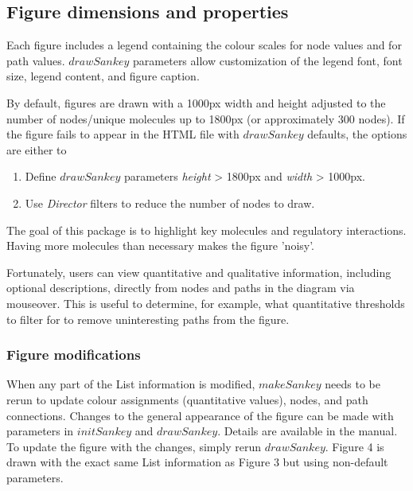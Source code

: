 \documentclass[a4paper]{article}
\begin{document}
    \subsection{Figure dimensions and properties}
Each figure includes a legend containing the colour scales for node values and for path values. $drawSankey$ parameters allow customization of the legend font, font size, legend content, and figure caption.

By default, figures are drawn with a 1000px width and height adjusted to the number of nodes/unique molecules up to 1800px (or approximately 300 nodes). If the figure fails to appear in the HTML file with $drawSankey$ defaults, the options are either to
\begin{enumerate}
    \item Define $drawSankey$ parameters \textit{height} > 1800px and \textit{width} > 1000px.
    \item Use \textit{Director} filters to reduce the number of nodes to draw.
\end{enumerate}

The goal of this package is to highlight key molecules and regulatory interactions. Having more molecules than necessary makes the figure 'noisy'.

Fortunately, users can view quantitative and qualitative information, including optional descriptions, directly from nodes and paths in the diagram via mouseover. This is useful to determine, for example, what quantitative thresholds to filter for to remove uninteresting paths from the figure.

    \subsubsection{Figure modifications}
    \label{sec:figMods}
When any part of the List information is modified, $makeSankey$ needs to be rerun to update colour assignments (quantitative values), nodes, and path connections. Changes to the general appearance of the figure can be made with parameters in $initSankey$ and $drawSankey$. Details are available in the manual. To update the figure with the changes, simply rerun $drawSankey$. Figure 4 is drawn with the exact same List information as Figure 3 but using non-default parameters.
\end{document}
